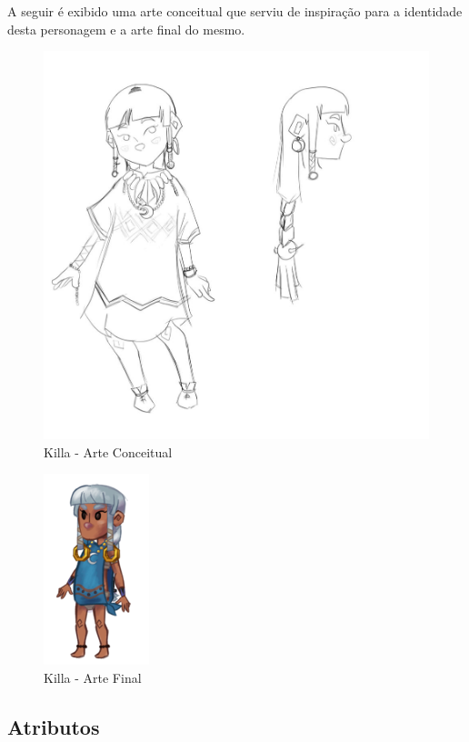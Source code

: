 \documentclass[12pt]{article}
\begin{document}
A seguir é exibido uma arte conceitual que serviu de inspiração para a identidade
desta personagem e a arte final do mesmo.

\begin{figure}[!htb]
    \centering
    \includegraphics[scale=0.2]{killa_conceitual.jpg}
    \caption{Killa - Arte Conceitual}
    \label{fig:kilaa_conceitual}
\end{figure}

\begin{figure}[!htb]
    \centering
    \includegraphics[scale=0.7]{killa_final.png}
    \caption{Killa - Arte Final}
    \label{fig:killa_final}
\end{figure}

\newpage

\subsection{Atributos}
\end{document}
